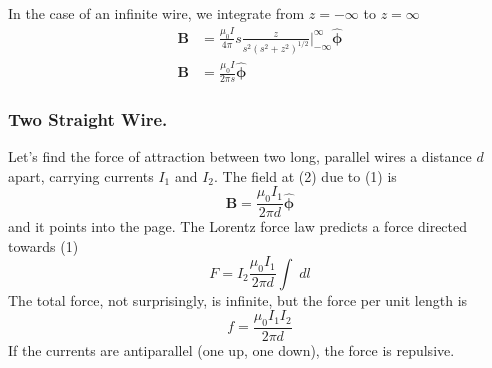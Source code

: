 \documentclass[../../../main.tex]{subfiles}
\begin{document}
In the case of an inﬁnite wire, we integrate from $z=-\infty$ to $z=\infty$
\begin{align*}
    \mathbf{B}&=\frac{\mu_0 I}{4\pi}s\frac{z}{s^2(s^2+z^2)^{1/2}}\bigg|_{- \infty}^{\infty}\boldsymbol{\hat{\phi}}\\
    \mathbf{B}&=\frac{\mu_0 I}{2\pi s}\boldsymbol{\hat{\phi}}
\end{align*}

\subsubsection*{Two Straight Wire.}  Let’s ﬁnd the force of attraction between two long, parallel 
wires a distance $d$ apart, carrying currents $I_1$ and $I_2$. The ﬁeld at (2) due to (1) is
\begin{equation*}
    \mathbf{B}=\frac{\mu_0 I_1}{2\pi d}\boldsymbol{\hat{\phi}}
\end{equation*}
and it points into the page. The Lorentz force law predicts a force directed towards (1)
\begin{equation*}
    F=I_2\frac{\mu_0 I_1}{2\pi d}\int\;dl
\end{equation*}
The total force, not surprisingly, is inﬁnite, but the force per unit length is
\begin{equation*}
    f=\frac{\mu_0 I_1I_2}{2\pi d}
\end{equation*}
If the currents are antiparallel (one up, one down), the force is repulsive.
\begin{figure*}[ht]
    \centering
\end{figure*}
\end{document}
